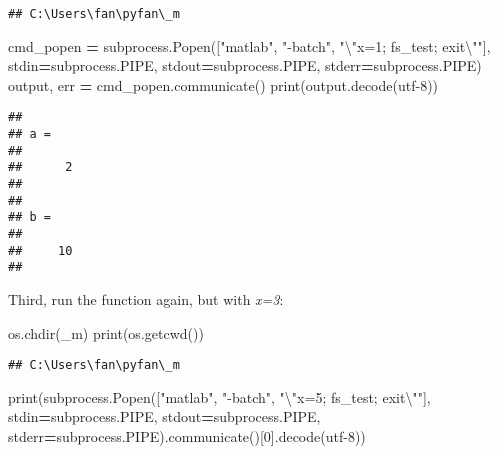 \documentclass[
]{book}
\newenvironment{Shaded}{\begin{snugshade}}{\end{snugshade}}
\newcommand{\BuiltInTok}[1]{#1}
\newcommand{\CharTok}[1]{\textcolor[rgb]{0.31,0.60,0.02}{#1}}
\newcommand{\DecValTok}[1]{\textcolor[rgb]{0.00,0.00,0.81}{#1}}
\newcommand{\NormalTok}[1]{#1}
\newcommand{\OperatorTok}[1]{\textcolor[rgb]{0.81,0.36,0.00}{\textbf{#1}}}
\newcommand{\StringTok}[1]{\textcolor[rgb]{0.31,0.60,0.02}{#1}}
\begin{document}
\begin{verbatim}
## C:\Users\fan\pyfan\_m
\end{verbatim}

\begin{Shaded}
\begin{Highlighting}[]
\NormalTok{cmd\_popen }\OperatorTok{=}\NormalTok{ subprocess.Popen([}\StringTok{"matlab"}\NormalTok{, }\StringTok{"{-}batch"}\NormalTok{, }\StringTok{"}\CharTok{\textbackslash{}"}\StringTok{x=1; fs\_test; exit}\CharTok{\textbackslash{}"}\StringTok{"}\NormalTok{],}
\NormalTok{                             stdin}\OperatorTok{=}\NormalTok{subprocess.PIPE,}
\NormalTok{                             stdout}\OperatorTok{=}\NormalTok{subprocess.PIPE,}
\NormalTok{                             stderr}\OperatorTok{=}\NormalTok{subprocess.PIPE)}
\NormalTok{output, err }\OperatorTok{=}\NormalTok{ cmd\_popen.communicate()}
\BuiltInTok{print}\NormalTok{(output.decode(}\StringTok{\textquotesingle{}utf{-}8\textquotesingle{}}\NormalTok{))}
\end{Highlighting}
\end{Shaded}

\begin{verbatim}
## 
## a =
## 
##      2
## 
## 
## b =
## 
##     10
## 
\end{verbatim}

Third, run the function again, but with \emph{x=3}:

\begin{Shaded}
\begin{Highlighting}[]
\NormalTok{os.chdir(}\StringTok{\textquotesingle{}\_m\textquotesingle{}}\NormalTok{)}
\BuiltInTok{print}\NormalTok{(os.getcwd())}
\end{Highlighting}
\end{Shaded}

\begin{verbatim}
## C:\Users\fan\pyfan\_m
\end{verbatim}

\begin{Shaded}
\begin{Highlighting}[]
\BuiltInTok{print}\NormalTok{(subprocess.Popen([}\StringTok{"matlab"}\NormalTok{, }\StringTok{"{-}batch"}\NormalTok{, }\StringTok{"}\CharTok{\textbackslash{}"}\StringTok{x=5; fs\_test; exit}\CharTok{\textbackslash{}"}\StringTok{"}\NormalTok{],}
\NormalTok{                       stdin}\OperatorTok{=}\NormalTok{subprocess.PIPE,}
\NormalTok{                       stdout}\OperatorTok{=}\NormalTok{subprocess.PIPE,}
\NormalTok{                       stderr}\OperatorTok{=}\NormalTok{subprocess.PIPE).communicate()[}\DecValTok{0}\NormalTok{].decode(}\StringTok{\textquotesingle{}utf{-}8\textquotesingle{}}\NormalTok{))}
\end{Highlighting}
\end{Shaded}
\end{document}

